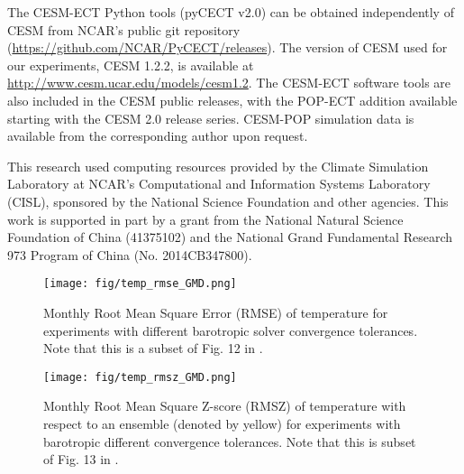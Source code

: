 \documentclass[gmd, manuscript]{copernicus}
\begin{document}
The CESM-ECT Python tools (pyCECT v2.0) can be obtained independently of CESM from NCAR's public git repository (\url{https://github.com/NCAR/PyCECT/releases}).  The version of CESM used for our experiments, CESM 1.2.2, is available at \url{http://www.cesm.ucar.edu/models/cesm1.2}. The CESM-ECT software tools are also included in the CESM public releases, with the POP-ECT addition available starting with the CESM 2.0 release series. 
CESM-POP simulation data is available from the corresponding author upon request.


 \begin{acknowledgements}
   This research used computing resources provided by the Climate
   Simulation Laboratory at NCAR's Computational and Information
   Systems Laboratory (CISL), sponsored by the National Science
   Foundation and other agencies. This work is supported in part by a
   grant from the National Natural Science Foundation of China
   (41375102) and the National Grand Fundamental Research 973 Program of China (No. 2014CB347800). 
 \end{acknowledgements}



 



\clearpage
\begin{figure}[h]
\texttt{[image: fig/temp\_rmse\_GMD.png]}
\caption {Monthly Root Mean Square Error (RMSE) of temperature for experiments with different barotropic solver convergence tolerances. Note that this is a subset of Fig. 12 in \cite{yong2015}.}
\label{fig:rmse_temp}
\end{figure} 

\clearpage
 \begin{figure}[h]
 \begin{center}
 \texttt{[image: fig/temp\_rmsz\_GMD.png]}
 \end{center}
 \caption {Monthly Root Mean Square Z-score (RMSZ) of temperature with respect to an ensemble (denoted by yellow) for experiments with barotropic different convergence tolerances. Note that this is subset of Fig. 13 in \cite{yong2015}. }
 \label{fig:rmsz_temp_ens}
 \end{figure} 
\end{document}

